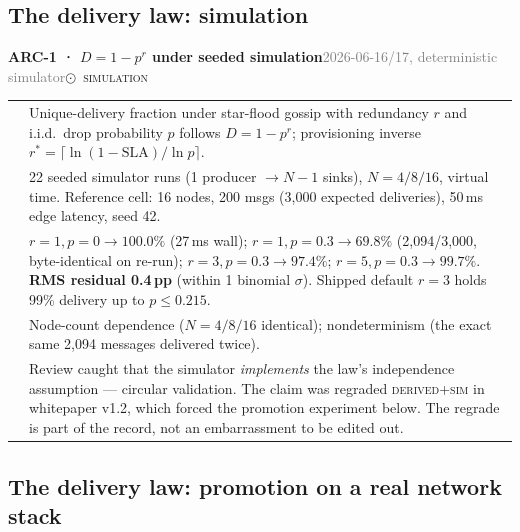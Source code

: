 \documentclass[10pt,a4paper]{article}
\makeatletter
\newcommand{\stS}{\textcolor{sigilblue}{$\odot$}~{\scriptsize\textcolor{sigilblue}{\textsc{simulation}}}}
\newcommand{\measured}[1]{\textcolor{sigilcyan}{\textbf{#1}}}
\newcommand{\frow}[2]{{\footnotesize\textcolor{gray}{\textsc{#1}}}\;&\small #2\\}
\newenvironment{mentry}[4]{%
\begin{tcolorbox}[enhanced,breakable,colback=white,colframe=slate,boxrule=0.6pt,arc=2pt,
  left=8pt,right=8pt,top=6pt,bottom=6pt,
  borderline west={3pt}{0pt}{sigilcyan!70!slate}]
{\small\textbf{#1 · #2}\hfill{\footnotesize\textcolor{gray}{#3}}\quad#4}\\[4pt]
\begin{tabular}{@{}>{\raggedleft\arraybackslash}p{1.8cm}p{13.2cm}@{}}
}{%
\end{tabular}
\end{tcolorbox}\vspace{2pt}}
\makeatother
\begin{document}
\subsection{The delivery law: simulation}
\label{sec:law}

\begin{mentry}{ARC-1}{$D = 1-p^{r}$ under seeded simulation}{2026-06-16/17, deterministic simulator}{\stS}
\frow{claim}{Unique-delivery fraction under star-flood gossip with redundancy $r$ and
i.i.d.\ drop probability $p$ follows $D = 1-p^{r}$; provisioning inverse
$r^{*} = \lceil \ln(1-\mathrm{SLA}) / \ln p \rceil$.}
\frow{method}{22 seeded simulator runs (1 producer $\to N{-}1$ sinks), $N=4/8/16$,
virtual time. Reference cell: 16 nodes, 200 msgs (3{,}000 expected deliveries), 50\,ms
edge latency, seed 42.}
\frow{result}{$r{=}1,p{=}0\to100.0\%$ (27\,ms wall); $r{=}1,p{=}0.3\to69.8\%$
(2{,}094/3{,}000, byte-identical on re-run); $r{=}3,p{=}0.3\to97.4\%$;
$r{=}5,p{=}0.3\to99.7\%$. \measured{RMS residual 0.4\,pp} (within 1 binomial $\sigma$).
Shipped default $r{=}3$ holds 99\% delivery up to $p\le0.215$.}
\frow{ruled out}{Node-count dependence ($N=4/8/16$ identical); nondeterminism (the exact
same 2{,}094 messages delivered twice).}
\frow{regrade}{Review caught that the simulator \emph{implements} the law's independence
assumption --- circular validation. The claim was regraded \textsc{derived+sim} in
whitepaper v1.2, which forced the promotion experiment below. The regrade is part of the
record, not an embarrassment to be edited out.}
\end{mentry}

\subsection{The delivery law: promotion on a real network stack}
\end{document}
